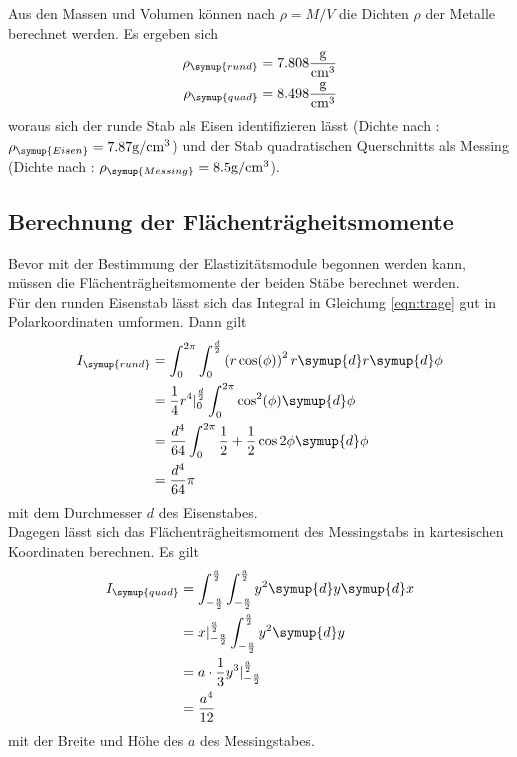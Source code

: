   \noindent Aus den Massen und Volumen können nach $\rho = M/V$ die Dichten $\rho$ der 
  Metalle berechnet werden. Es ergeben sich
  \begin{align*}
    \rho_{\symup{rund}} = 7.808 \si{\g\per\centi\m\cubed}\\
    \rho_{\symup{quad}} = 8.498 \si{\g\per\centi\m\cubed}
  \end{align*}
  woraus sich der runde Stab als Eisen identifizieren lässt (Dichte nach \cite{dichten}: $\rho_{\symup{Eisen}} = 7.87 \si{\g\per\centi\m\cubed}$)
  und der Stab quadratischen Querschnitts als Messing (Dichte nach \cite{dichten}: $\rho_{\symup{Messing}} = 8.5 \si{\g\per\centi\m\cubed}$).\\

\subsection{Berechnung der Flächenträgheitsmomente}
  Bevor mit der Bestimmung der Elastizitätsmodule begonnen werden kann, müssen die Flächenträgheitsmomente der beiden 
  Stäbe berechnet werden.\\
  Für den runden Eisenstab lässt sich das Integral in Gleichung \eqref{eqn:trage} gut in Polarkoordinaten 
  umformen. Dann gilt
  \begin{align*}
    I_{\symup{rund}} &= \int_0^{2 \pi} \int_0^{\frac{d}{2}} \left( r \cos(\phi)\right)^2 r \symup{d}r \symup{d}\phi \\
    &= \frac{1}{4} r^4|_{0}^{ \frac{d}{2} } \int_0^{2 \pi} \cos^2(\phi) \symup{d}\phi \\
    &= \frac{d^4}{64} \int_{0}^{2 \pi} \frac{1}{2} + \frac{1}{2} \cos{2 \phi} \symup{d}\phi\\
    &= \frac{d^4}{64} \pi 
  \end{align*}
  mit dem Durchmesser $d$ des Eisenstabes.\\

  \noindent Dagegen lässt sich das Flächenträgheitsmoment des Messingstabs in kartesischen Koordinaten berechnen. Es gilt
  \begin{align*}
    I_{\symup{quad}} &= \int_{- \frac{a}{2}}^{ \frac{a}{2} } \int_{ - \frac{a}{2}}^{ \frac{a}{2}} y^2 \symup{d}y \symup{d}x \\
    &= x|_{ - \frac{a}{2}}^{ \frac{a}{2}} \int_{ - \frac{a}{2}}^{ \frac{a}{2}} y^2 \symup{d}y\\
    &= a \cdot \frac{1}{3} y^3|_{ - \frac{a}{2}}^{ \frac{a}{2}}\\
    &= \frac{a^4}{12}
  \end{align*}
  mit der Breite und Höhe des $a$ des Messingstabes.

